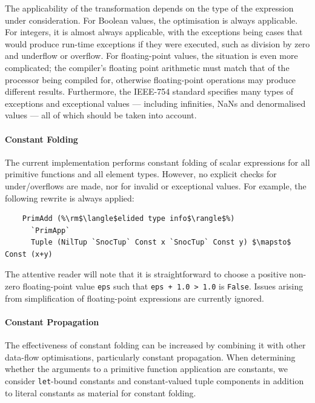 The applicability of the transformation depends on the type of the expression
under consideration. For Boolean values, the optimisation is always applicable.
For integers, it is almost always applicable, with the exceptions being cases
that would produce run-time exceptions if they were executed, such as division
by zero and underflow or overflow. For floating-point values, the situation is
even more complicated; the compiler's floating point arithmetic must match that
of the processor being compiled for, otherwise floating-point operations may
produce different results. Furthermore, the IEEE-754 standard specifies many
types of exceptions and exceptional values --- including infinities, NaNs and
denormalised values --- all of which should be taken into account.


\paragraph{Constant Folding}

The current implementation performs constant folding of scalar expressions for
all primitive functions and all element types. However, no explicit checks for
under/overflows are made, nor for invalid or exceptional values. For example,
the following rewrite is always applied:
%
%
\begin{lstlisting}[style=Haskell,numbers=none,mathescape]
%\bf$\langle$ constant folding $\rangle$%
    PrimAdd (%\rm$\langle$elided type info$\rangle$%)
      `PrimApp`
      Tuple (NilTup `SnocTup` Const x `SnocTup` Const y) $\mapsto$ Const (x+y)
\end{lstlisting}
%
The attentive reader will note that it is straightforward to choose a positive
non-zero floating-point value \texttt{eps} such that \lstinline{eps + 1.0 > 1.0}
is \texttt{False}. Issues arising from simplification of floating-point
expressions are currently ignored.



\paragraph{Constant Propagation}

The effectiveness of constant folding can be increased by combining it with
other data-flow optimisations, particularly constant propagation. When
determining whether the arguments to a primitive function application are
constants, we consider \texttt{let}-bound constants and constant-valued tuple
components in addition to literal constants as material for constant folding.


